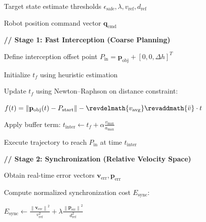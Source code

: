 \begin{algorithm}[t]
\caption{Two-Stage Dynamic Grasping Planning Strategy}
\label{algo:two_stage_dynamic_grasping}
\begin{algorithmic}[1]

\Require Target state estimate
  
thresholds $\epsilon_{\text{safe}},\lambda,v_{\text{ref}},d_{\text{ref}}$

\Ensure Robot position command vector $\mathbf{q}_{\text{cmd}}$

\State \textbf{// Stage 1: Fast Interception (Coarse Planning)}

\State Define interception offset point
$P_{\text{in}}=\mathbf{p}_{\text{obj}}+[0,0,\Delta h]^{T}$

\State Initialize $t_f$ using heuristic estimation

\Repeat

    \State Update $t_f$ using Newton--Raphson on distance constraint:

    \State
    $f(t)=
    \left\|
    \mathbf{p}_{\text{obj}}(t)-P_{\text{start}}
    \right\|
    -
    \revdelmath{v_{\text{avg}}}\revaddmath{\bar v}\cdot t$
    \Statex {}


\State Apply buffer term:
$t_{\text{inter}}\gets t_f+\alpha\frac{v_{\text{max}}}{a_{\text{max}}}$

\State Execute trajectory to reach $P_{\text{in}}$ at time $t_{\text{inter}}$

\State \textbf{// Stage 2: Synchronization (Relative Velocity Space)}


    \State Obtain real-time error vectors
    $\mathbf{v}_{\text{err}},\mathbf{p}_{\text{err}}$

    \State Compute normalized synchronization cost $E_{\text{sync}}$:

    \State
    $E_{\text{sync}}
    \gets
    \frac{\left\|\mathbf{v}_{\text{err}}\right\|^2}{v_{\text{ref}}^{2}}
    +
    \lambda
    \frac{\left\|\mathbf{p}_{\text{err}}\right\|^2}{d_{\text{ref}}^{2}}$


\end{algorithmic}
\end{algorithm}
